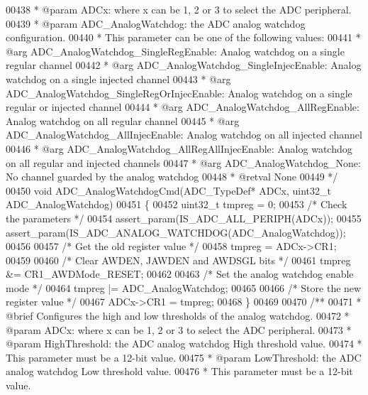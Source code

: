 \begin{DoxyCode}
00438 \textcolor{comment}{  * @param  ADCx: where x can be 1, 2 or 3 to select the ADC peripheral.}
00439 \textcolor{comment}{  * @param  ADC\_AnalogWatchdog: the ADC analog watchdog configuration.}
00440 \textcolor{comment}{  *         This parameter can be one of the following values:}
00441 \textcolor{comment}{  *            @arg ADC\_AnalogWatchdog\_SingleRegEnable: Analog watchdog on a single regular channel}
00442 \textcolor{comment}{  *            @arg ADC\_AnalogWatchdog\_SingleInjecEnable: Analog watchdog on a single injected channel}
00443 \textcolor{comment}{  *            @arg ADC\_AnalogWatchdog\_SingleRegOrInjecEnable: Analog watchdog on a single regular or
       injected channel}
00444 \textcolor{comment}{  *            @arg ADC\_AnalogWatchdog\_AllRegEnable: Analog watchdog on all regular channel}
00445 \textcolor{comment}{  *            @arg ADC\_AnalogWatchdog\_AllInjecEnable: Analog watchdog on all injected channel}
00446 \textcolor{comment}{  *            @arg ADC\_AnalogWatchdog\_AllRegAllInjecEnable: Analog watchdog on all regular and
       injected channels}
00447 \textcolor{comment}{  *            @arg ADC\_AnalogWatchdog\_None: No channel guarded by the analog watchdog}
00448 \textcolor{comment}{  * @retval None      }
00449 \textcolor{comment}{  */}
00450 \textcolor{keywordtype}{void} ADC_AnalogWatchdogCmd(ADC\_TypeDef* ADCx, uint32\_t ADC\_AnalogWatchdog)
00451 \{
00452   uint32\_t tmpreg = 0;
00453   \textcolor{comment}{/* Check the parameters */}
00454   assert_param(IS\_ADC\_ALL\_PERIPH(ADCx));
00455   assert_param(IS\_ADC\_ANALOG\_WATCHDOG(ADC\_AnalogWatchdog));
00456 
00457   \textcolor{comment}{/* Get the old register value */}
00458   tmpreg = ADCx->CR1;
00459 
00460   \textcolor{comment}{/* Clear AWDEN, JAWDEN and AWDSGL bits */}
00461   tmpreg &= CR1_AWDMode_RESET;
00462 
00463   \textcolor{comment}{/* Set the analog watchdog enable mode */}
00464   tmpreg |= ADC\_AnalogWatchdog;
00465 
00466   \textcolor{comment}{/* Store the new register value */}
00467   ADCx->CR1 = tmpreg;
00468 \}
00469 
00470 \textcolor{comment}{/**}
00471 \textcolor{comment}{  * @brief  Configures the high and low thresholds of the analog watchdog.}
00472 \textcolor{comment}{  * @param  ADCx: where x can be 1, 2 or 3 to select the ADC peripheral.}
00473 \textcolor{comment}{  * @param  HighThreshold: the ADC analog watchdog High threshold value.}
00474 \textcolor{comment}{  *          This parameter must be a 12-bit value.}
00475 \textcolor{comment}{  * @param  LowThreshold:  the ADC analog watchdog Low threshold value.}
00476 \textcolor{comment}{  *          This parameter must be a 12-bit value.}

\end{DoxyCode}
